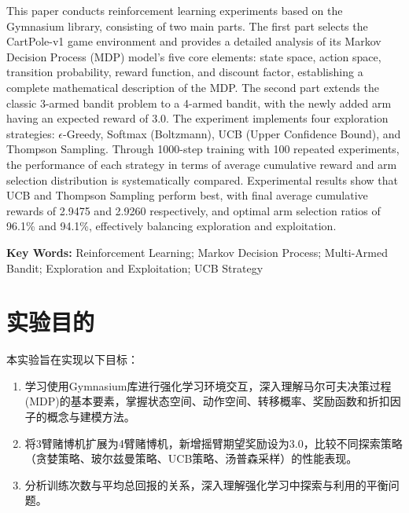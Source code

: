 \documentclass[12pt,a4paper]{article}
\begin{document}
This paper conducts reinforcement learning experiments based on the Gymnasium library, consisting of two main parts. The first part selects the CartPole-v1 game environment and provides a detailed analysis of its Markov Decision Process (MDP) model's five core elements: state space, action space, transition probability, reward function, and discount factor, establishing a complete mathematical description of the MDP. The second part extends the classic 3-armed bandit problem to a 4-armed bandit, with the newly added arm having an expected reward of 3.0. The experiment implements four exploration strategies: $\epsilon$-Greedy, Softmax (Boltzmann), UCB (Upper Confidence Bound), and Thompson Sampling. Through 1000-step training with 100 repeated experiments, the performance of each strategy in terms of average cumulative reward and arm selection distribution is systematically compared. Experimental results show that UCB and Thompson Sampling perform best, with final average cumulative rewards of 2.9475 and 2.9260 respectively, and optimal arm selection ratios of 96.1\% and 94.1\%, effectively balancing exploration and exploitation.

\vspace{12pt}

\noindent\textbf{Key Words:} Reinforcement Learning; Markov Decision Process; Multi-Armed Bandit; Exploration and Exploitation; UCB Strategy

\newpage

\section{实验目的}

\setlength{\parindent}{2em}
\setlength{\parskip}{0pt}

本实验旨在实现以下目标：

\begin{enumerate}
    \item 学习使用Gymnasium库进行强化学习环境交互，深入理解马尔可夫决策过程(MDP)的基本要素，掌握状态空间、动作空间、转移概率、奖励函数和折扣因子的概念与建模方法。
    
    \item 将3臂赌博机扩展为4臂赌博机，新增摇臂期望奖励设为3.0，比较不同探索策略（贪婪策略、玻尔兹曼策略、UCB策略、汤普森采样）的性能表现。
    
    \item 分析训练次数与平均总回报的关系，深入理解强化学习中探索与利用的平衡问题。
\end{enumerate}
\end{document}
